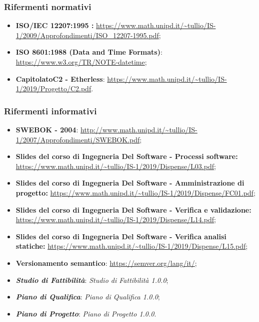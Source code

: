 \subsubsection{Rifermenti normativi}
\begin{itemize}
  \item \textbf{ISO/IEC 12207:1995 :} \url{https://www.math.unipd.it/~tullio/IS-1/2009/Approfondimenti/ISO_12207-1995.pdf};
  \item \textbf{ISO 8601:1988 (Data and Time Formats)}: \url {https://www.w3.org/TR/NOTE-datetime};
  \item \textbf{Capitolato\glo C2 - Etherless}: \url{https://www.math.unipd.it/~tullio/IS-1/2019/Progetto/C2.pdf}.
\end{itemize}

\subsubsection{Rifermenti informativi}
\begin{itemize}
  \item \textbf{SWEBOK - 2004}: \url{http://www.math.unipd.it/~tullio/IS-1/2007/Approfondimenti/SWEBOK.pdf};
  \item \textbf{Slides del corso di Ingegneria Del Software - Processi software:} \url{https://www.math.unipd.it/~tullio/IS-1/2019/Dispense/L03.pdf};
  \item \textbf{Slides del corso di Ingegneria Del Software - Amministrazione di progetto:} \url{https://www.math.unipd.it/~tullio/IS-1/2019/Dispense/FC01.pdf};
  \item \textbf{Slides del corso di Ingegneria Del Software - Verifica e validazione:} \url{https://www.math.unipd.it/~tullio/IS-1/2019/Dispense/L14.pdf};
  \item \textbf{Slides del corso di Ingegneria Del Software - Verifica analisi statiche:} \url{https://www.math.unipd.it/~tullio/IS-1/2019/Dispense/L15.pdf};
  \item \textbf{Versionamento semantico}: \url{https://semver.org/lang/it/};
  \item \textbf{\textit{Studio di Fattibilità}}: \textit{Studio di Fattibilità 1.0.0\docs};
  \item \textbf{\textit{Piano di Qualifica}}: \textit{Piano di Qualifica 1.0.0\docs};
  \item \textbf{\textit{Piano di Progetto}}: \textit{Piano di Progetto 1.0.0\docs}.

\end{itemize}
